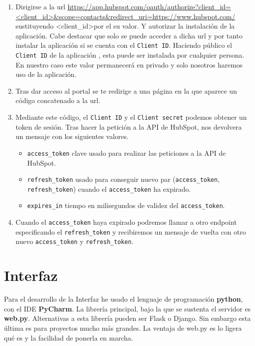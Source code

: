 \begin{enumerate}
	\item Dirigirse a la url \url{https://app.hubspot.com/oauth/authorize?client_id=<client_id>&scope=contacts&redirect_uri=https://www.hubspot.com/}
		\\ 
		sustituyendo \textless client\_id\textgreater por el su valor. Y autorizar la instalación de la aplicación. Cabe destacar que solo se puede acceder a dicha url  y por tanto instalar la aplicación si se cuenta con el \verb|Client ID|.
		Haciendo público el \verb|Client ID| de la aplicación , esta puede ser instalada por cualquier persona. En nuestro caso este valor permanecerá en privado y solo nosotros haremos uso de la aplicación.
		
	\item Tras dar acceso al portal se te redirige a una página en la que aparece un código concatenado a la url.
	\item Mediante este código, el \verb|Client ID| y el \verb|Client secret| podemos obtener un token de sesión.
	Tras hacer la petición a la API de HubSpot, nos devolvera un mensaje con los siguientes valores.
		\begin{itemize}
			\item \verb|access_token| clave usado para realizar las peticiones a la API de HubSpot.
			\item \verb|refresh_token| usado para conseguir nuevo par (\verb|access_token|, \verb|refresh_token|) cuando el \verb|access_token| ha expirado.
			\item \verb|expires_in| tiempo en milisegundos de validez del \verb|access_token|.
		\end{itemize}
	\item Cuando el \verb|access_token| haya expirado podremos llamar a otro endpoint especificando el \verb|refresh_token| y recibiremos un mensaje de vuelta con otro nuevo \verb|access_token| y \verb|refresh_token|.
\end{enumerate}



\section{Interfaz}


Para el desarrollo de la Interfaz he usado el lenguaje de programación \textbf{python}, con el IDE \textbf{PyCharm}. La librería principal, bajo la que se sustenta el servidor es \textbf{web.py}.
Alternativas a esta librería pueden ser Flask o Django. Sin embargo esta última es para proyectos mucho más grandes. La ventaja de web.py es lo ligera qué es y la facilidad de ponerla en marcha.

